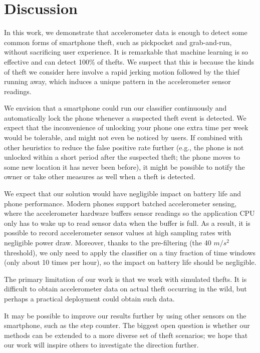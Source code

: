 \documentclass{soups}
\begin{document}
\section{Discussion}
In this work, we demonstrate that accelerometer data is enough to detect some common forms of smartphone theft, such as pickpocket and grab-and-run, without sacrificing user experience. 
It is remarkable that machine learning is so effective and can detect 100\% of thefts.
We suspect that this is because the kinds of theft we consider here involve a rapid jerking motion followed by the thief running away, which induces a unique pattern in the accelerometer sensor readings.

We envision that a smartphone could run our classifier continuously and automatically lock the phone whenever a suspected theft event is detected.
We expect that the inconvenience of unlocking your phone one extra time per week would be tolerable, and might not even be noticed by users.
If combined with other heuristics to reduce the false positive rate further (e.g., the phone is not unlocked within a short period after the suspected theft; the phone moves to some new location it has never been before), it might be possible to notify the owner or take other measures as well when a theft is detected.

We expect that our solution would have negligible impact on battery life and phone performance.
Modern phones support batched accelerometer sensing, where the accelerometer hardware buffers sensor readings so the application CPU only has to wake up to read sensor data when the buffer is full.
As a result, it is possible to record accelerometer sensor values at high sampling rates with negligible power draw.
Moreover, thanks to the pre-filtering (the 40 $m/s^2$ threshold),
we only need to apply the classifier on a tiny fraction of time windows (only about 10 times per hour),
so the impact on battery life should be negligible.

The primary limitation of our work is that we work with simulated thefts.
It is difficult to obtain accelerometer data on actual theft occurring in the wild, but perhaps a practical deployment could obtain such data.

It may be possible to improve our results further by using other sensors on the smartphone, such as the step counter.
The biggest open question is whether our methods can be extended to a more diverse set of theft scenarios; we hope that our work will inspire others to investigate the direction further.
\end{document}
